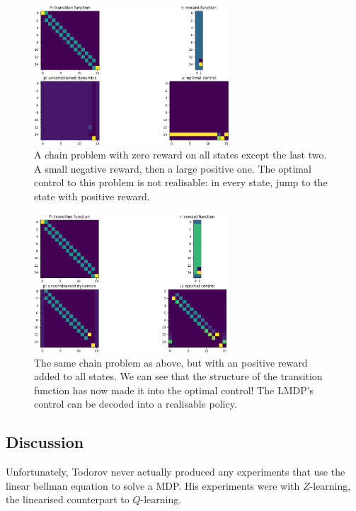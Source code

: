 \begin{figure}[h!]
\centering
\includegraphics[width=0.65\textwidth,height=0.325\textheight]{../../pictures/figures/chain-test-zero-rewards.png}
\caption{A chain problem \cite{Sutton2018a} with zero reward on all states except the last two. A small negative reward, then a large positive one.
The optimal control to this problem is not realisable: in every state, jump to the state with positive reward.}
\label{fig:chain-zero}
\end{figure}

\begin{figure}[h!]
\centering
\includegraphics[width=0.65\textwidth,height=0.325\textheight]{../../pictures/figures/chain-test-pos-rewards.png}
\caption{The same chain problem as above, but with an positive reward added to all states.
We can see that the structure of the transition function has now made it into the optimal control!
The LMDP's control can be decoded into a realisable policy.}
\label{fig:chain-pos}
\end{figure}

\newpage
\subsection{Discussion}\label{lmdp-validation}

Unfortunately, Todorov \cite{Todorov2006,Todorov2009} never actually produced
any experiments that use the linear bellman equation to solve a MDP.
His experiments were with $Z$-learning, the linearised counterpart to $Q$-learning.

